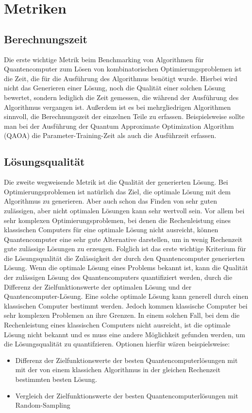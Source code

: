 \section{Metriken}

\subsection{Berechnungszeit}
Die erste wichtige Metrik beim Benchmarking von Algorithmen für Quantencomputer zum Lösen von kombinatorischen Optimierungsproblemen ist die Zeit, die für die Ausführung des Algorithmus benötigt wurde.
Hierbei wird nicht das Generieren einer Lösung, noch die Qualität einer solchen Lösung bewertet, sondern lediglich die Zeit gemessen, die während der Ausführung des Algorithmus vergangen ist.
Außerdem ist es bei mehrgliedrigen Algorithmen sinnvoll, die Berechnungszeit der einzelnen Teile zu erfassen. 
Beispielsweise sollte man bei der Ausführung der Quantum Approximate Optimization Algorithm (QAOA) die Parameter-Training-Zeit als auch die Ausführzeit erfassen.


\subsection{Lösungsqualität}
Die zweite wegweisende Metrik ist die Qualität der generierten Lösung. 
Bei Optimierungsproblemen ist natürlich das Ziel, die optimale Lösung mit dem Algorithmus zu generieren. 
Aber auch schon das Finden von sehr guten zulässigen, aber nicht optimalen Lösungen kann sehr wertvoll sein. Vor allem bei sehr komplexen Optimierungsproblemen, bei denen die Rechenleistung eines klassischen Computers für eine optimale Lösung nicht ausreicht, können Quantencomputer eine sehr gute Alternative darstellen, um in wenig Rechenzeit gute zulässige Lösungen zu erzeugen.
Folglich ist das erste wichtige Kriterium für die Lösungsqualität die Zulässigkeit der durch den Quantencomputer generierten Lösung.
Wenn die optimale Lösung eines Problems bekannt ist, kann die Qualität der zulässigen Lösung des Quantencomputers quantifiziert werden, durch die Differenz der Zielfunktionswerte der optimalen Lösung und der Quantencomputer-Lösung.
Eine solche optimale Lösung kann generell durch einen klassischen Computer bestimmt werden. Jedoch kommen klassische Computer bei sehr komplexen Problemen an ihre Grenzen. 
In einem solchen Fall, bei dem die Rechenleistung eines klassischen Computers nicht ausreicht, ist die optimale Lösung nicht bekannt und es muss eine andere Möglichkeit gefunden werden, um die Lösungsqualität zu quantifzieren.
Optionen hierfür wären beispielsweise:
\begin{itemize}
	\item Differenz der Zielfunktionswerte der besten Quantencomputerlösungen mit mit der von einem klassichen Algorithmus in der gleichen Rechenzeit bestimmten besten Lösung.
	\item Vergleich der Zielfunktionswerte der besten Quantencomputerlösungen mit Random-Sampling
\end{itemize}

